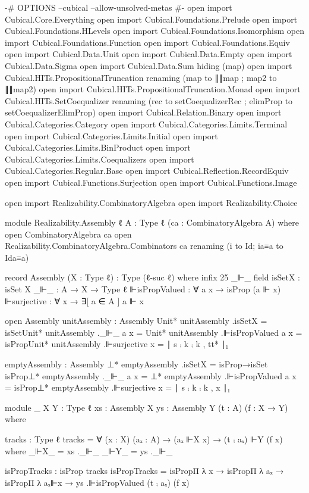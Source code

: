 {-# OPTIONS --cubical --allow-unsolved-metas #-}
open import Cubical.Core.Everything
open import Cubical.Foundations.Prelude
open import Cubical.Foundations.HLevels
open import Cubical.Foundations.Isomorphism
open import Cubical.Foundations.Function
open import Cubical.Foundations.Equiv
open import Cubical.Data.Unit
open import Cubical.Data.Empty
open import Cubical.Data.Sigma
open import Cubical.Data.Sum hiding (map)
open import Cubical.HITs.PropositionalTruncation renaming (map to ∥∥map ; map2 to ∥∥map2)
open import Cubical.HITs.PropositionalTruncation.Monad
open import Cubical.HITs.SetCoequalizer renaming (rec to setCoequalizerRec ; elimProp to setCoequalizerElimProp)
open import Cubical.Relation.Binary
open import Cubical.Categories.Category
open import Cubical.Categories.Limits.Terminal
open import Cubical.Categories.Limits.Initial
open import Cubical.Categories.Limits.BinProduct
open import Cubical.Categories.Limits.Coequalizers
open import Cubical.Categories.Regular.Base
open import Cubical.Reflection.RecordEquiv
open import Cubical.Functions.Surjection
open import Cubical.Functions.Image

open import Realizability.CombinatoryAlgebra
open import Realizability.Choice

module Realizability.Assembly {ℓ} {A : Type ℓ} (ca : CombinatoryAlgebra A) where
  open CombinatoryAlgebra ca
  open Realizability.CombinatoryAlgebra.Combinators ca renaming (i to Id; ia≡a to Ida≡a)

  record Assembly (X : Type ℓ) : Type (ℓ-suc ℓ) where
    infix 25 _⊩_
    field
      isSetX : isSet X
      _⊩_ : A → X → Type ℓ
      ⊩isPropValued : ∀ a x → isProp (a ⊩ x)
      ⊩surjective : ∀ x → ∃[ a ∈ A ] a ⊩ x

  open Assembly
  unitAssembly : Assembly Unit*
  unitAssembly .isSetX = isSetUnit*
  unitAssembly ._⊩_ a x = Unit*
  unitAssembly .⊩isPropValued a x = isPropUnit*
  unitAssembly .⊩surjective x = ∣ s ⨾ k ⨾ k , tt* ∣₁

  emptyAssembly : Assembly ⊥*
  emptyAssembly .isSetX = isProp→isSet isProp⊥*
  emptyAssembly ._⊩_ a x = ⊥*
  emptyAssembly .⊩isPropValued a x = isProp⊥*
  emptyAssembly .⊩surjective x = ∣ s ⨾ k ⨾ k , x ∣₁

  module _ {X Y : Type ℓ} {xs : Assembly X} {ys : Assembly Y} (t : A) (f : X → Y)  where
    
    tracks : Type ℓ
    tracks = ∀ (x : X) (aₓ : A) → (aₓ ⊩X x) → (t ⨾ aₓ) ⊩Y (f x) where
      _⊩X_ = xs ._⊩_
      _⊩Y_ = ys ._⊩_
      
    isPropTracks : isProp tracks
    isPropTracks = isPropΠ λ x →
                           isPropΠ λ aₓ →
                             isPropΠ λ aₓ⊩x →
                               ys .⊩isPropValued (t ⨾ aₓ) (f x)
    
